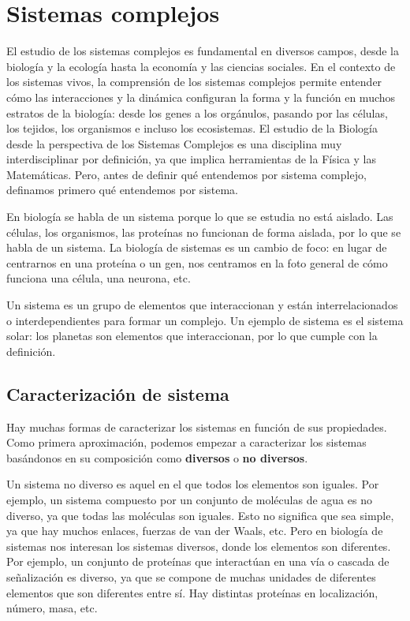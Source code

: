 \section{Sistemas complejos}
El estudio de los sistemas complejos es fundamental en diversos campos, desde la biología y la ecología hasta la economía y las ciencias sociales. En el contexto de los sistemas vivos, la comprensión de los sistemas complejos permite entender cómo las interacciones y la dinámica configuran la forma y la función en muchos estratos de la biología: desde los genes a los orgánulos, pasando por las células, los tejidos, los organismos e incluso los ecosistemas. El estudio de la Biología desde la perspectiva de los Sistemas Complejos es una disciplina muy interdisciplinar por definición, ya que implica herramientas de la Física y las Matemáticas. Pero, antes de definir qué entendemos por sistema complejo, definamos primero qué entendemos por sistema.

En biología se habla de un sistema porque lo que se estudia no está aislado. Las células, los organismos, las proteínas no funcionan de forma aislada, por lo que se habla de un sistema. La biología de sistemas es un cambio de foco: en lugar de centrarnos en una proteína o un gen, nos centramos en la foto general de cómo funciona una célula, una neurona, etc. 

Un sistema es un grupo de elementos que interaccionan y están interrelacionados o interdependientes para formar un complejo. Un ejemplo de sistema es el sistema solar: los planetas son elementos que interaccionan, por lo que cumple con la definición.

\subsection{Caracterización de sistema}
Hay muchas formas de caracterizar los sistemas en función de sus propiedades. Como primera aproximación, podemos empezar a caracterizar los sistemas basándonos en su composición como \textbf{diversos} o \textbf{no diversos}.

Un sistema no diverso es aquel en el que todos los elementos son iguales. Por ejemplo, un sistema compuesto por un conjunto de moléculas de agua es no diverso, ya que todas las moléculas son iguales. Esto no significa que sea simple, ya que hay muchos enlaces, fuerzas de van der Waals, etc. Pero en biología de sistemas nos interesan los sistemas diversos, donde los elementos son diferentes. Por ejemplo, un conjunto de proteínas que interactúan en una vía o cascada de señalización es diverso, ya que se compone de muchas unidades de diferentes elementos que son diferentes entre sí. Hay distintas proteínas en localización, número, masa, etc.

